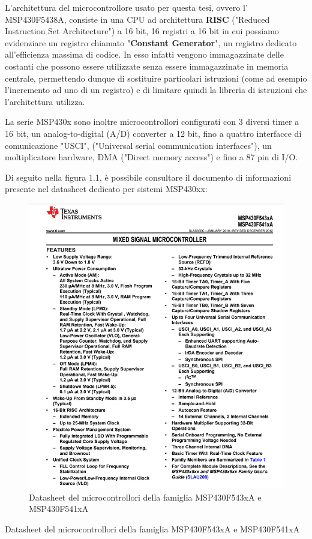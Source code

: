 \documentclass[LaM,binding=0.6cm]{../sapthesis}
\begin{document}
L'architettura del microcontrollore usato per questa tesi, ovvero l' MSP430F5438A, consiste in una CPU ad architettura \textbf{RISC} ("Reduced Instruction Set Architecture") a 16 bit, 16 registri a 16 bit in cui possiamo evidenziare un registro chiamato "\textbf{Constant Generator}", un registro dedicato all'efficienza massima di codice. In esso infatti vengono immagazzinate delle costanti che possono essere utilizzate senza essere immagazzinate in memoria centrale, permettendo dunque di sostituire particolari istruzioni (come ad esempio l'incremento ad uno di un registro) e di limitare quindi la libreria di istruzioni che l'architettura utilizza.

La serie MSP430x sono inoltre microcontrollori configurati con 3 diversi timer a 16 bit, un analog-to-digital (A/D) converter a 12 bit, fino a quattro interfacce di comunicazione "USCI", ("Universal serial communication interfaces"), un moltiplicatore hardware, DMA ("Direct memory access") e fino a 87 pin di I/O.

Di seguito nella figura 1.1, è possibile consultare il documento di informazioni presente nel datasheet dedicato per sistemi MSP430xx:

    \begin{figure}[htbp]
    \centerline{\includegraphics[scale=.67]{examples/Msp430Datasheet.PNG}}
    \caption{Datasheet del microcontrollori della famiglia MSP430F543xA e MSP430F541xA}
    \label{fig}
    \end{figure}
Datasheet del microcontrollori della famiglia MSP430F543xA e MSP430F541xA
\clearpage
\end{document}
